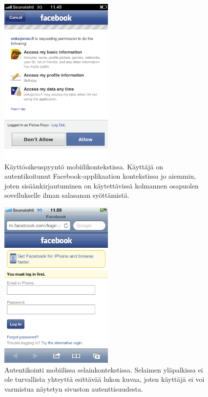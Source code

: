 \documentclass[finnish,gradu]{tktltiki}
\begin{document}
  \begin{figure}
    \centering
    \includegraphics[width=0.5\textwidth]{images/trust_context_mobile_fb.png}
    \caption{Käyttöoikeuspyyntö mobiilikontekstissa. Käyttäjä on autentikoitunut Facebook-applikaation kontekstissa jo aiemmin, joten sisäänkirjautuminen on käytettävissä kolmannen osapuolen sovellukselle ilman salasanan syöttämistä.}
    \label{fig:trust_context_mobile_fb}
  \end{figure}

  \begin{figure}
    \centering
    \includegraphics[width=0.5\textwidth]{images/trust_context_mobile_unknown_secure.png}
    \caption{Autentikointi mobiilissa selainkontekstissa. Selaimen yläpalkissa ei ole turvallista yhteyttä esittävää lukon kuvaa, joten käyttäjä ei voi varmistua näytetyn sivuston autenttisuudesta.}
    \label{fig:trust_context_mobile_unknown_secure}
  \end{figure}
\end{document}
